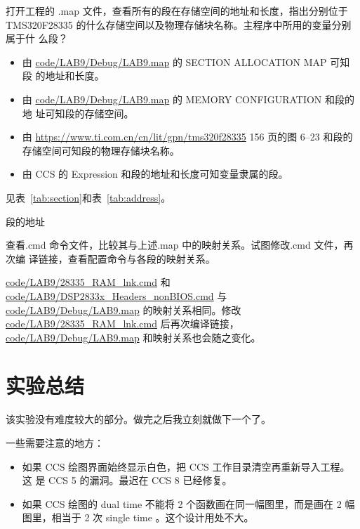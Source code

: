 \documentclass[../main]{subfiles}
\begin{document}
\begin{Exercise}
  打开工程的 .map 文件，查看所有的段在存储空间的地址和长度，指出分别位于
  TMS320F28335 的什么存储空间以及物理存储块名称。主程序中所用的变量分别属于什
  么段？
\end{Exercise}

\begin{Answer}
  \begin{itemize}
    \item 由 \url{code/LAB9/Debug/LAB9.map} 的 SECTION ALLOCATION MAP 可知段
      的地址和长度。
    \item 由 \url{code/LAB9/Debug/LAB9.map} 的 MEMORY CONFIGURATION 和段的地
      址可知段的存储空间。
    \item 由 \url{https://www.ti.com.cn/cn/lit/gpn/tms320f28335} 156 页的图
      6--23 和段的存储空间可知段的物理存储块名称。
    \item 由 CCS 的 Expression 和段的地址和长度可知变量隶属的段。
  \end{itemize}
  见表~\ref{tab:section}和表~\ref{tab:address}。
\end{Answer}

\begin{table}[htbp]
  \centering
  \caption{段的地址}%
  \label{tab:section}
  \tiny
\end{table}

\begin{Exercise}
  查看.cmd 命令文件，比较其与上述.map 中的映射关系。试图修改.cmd 文件，再次编
  译链接，查看配置命令与各段的映射关系。
\end{Exercise}

\begin{Answer}
  \url{code/LAB9/28335_RAM_lnk.cmd} 和
  \url{code/LAB9/DSP2833x_Headers_nonBIOS.cmd} 与
  \url{code/LAB9/Debug/LAB9.map} 的映射关系相同。修改
  \url{code/LAB9/28335_RAM_lnk.cmd} 后再次编译链接，
  \url{code/LAB9/Debug/LAB9.map} 和映射关系也会随之变化。
\end{Answer}

\section{实验总结}%
\label{sec:\arabic{chapter}conclusion}

该实验没有难度较大的部分。做完之后我立刻就做下一个了。

一些需要注意的地方：

\begin{itemize}
  \item 如果 CCS 绘图界面始终显示白色，把 CCS 工作目录清空再重新导入工程。这
    是 CCS 5 的漏洞。最迟在 CCS 8 已经修复。
  \item 如果 CCS 绘图的 dual time 不能将 2 个函数画在同一幅图里，而是画在 2
    幅图里，相当于 2 次 single time 。这个设计用处不大。
\end{itemize}
\end{document}
